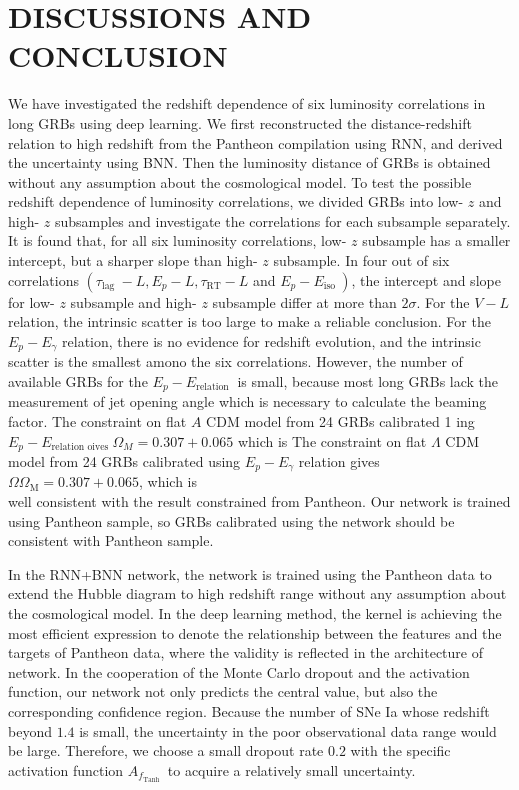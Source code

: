 \documentclass[10pt, a4paper]{article}
\begin{document}
\section{DISCUSSIONS AND CONCLUSION}
We have investigated the redshift dependence of six luminosity correlations in long GRBs using deep learning. We first reconstructed the distance-redshift relation to high redshift from the Pantheon compilation using RNN, and derived the uncertainty using BNN. Then the luminosity distance of GRBs is obtained without any assumption about the cosmological model. To test the possible redshift dependence of luminosity correlations, we divided GRBs into low- $z$ and high- $z$ subsamples and investigate the correlations for each subsample separately. It is found that, for all six luminosity correlations, low- $z$ subsample has a smaller intercept, but a sharper slope than high- $z$ subsample. In four out of six correlations $\left(\tau_{\text {lag }}-L, E_{p}-L, \tau_{\mathrm{RT}}-L\right.$ and $\left.E_{p}-E_{\text {iso }}\right)$, the intercept and slope for low- $z$ subsample and high- $z$ subsample differ at more than $2 \sigma$. For the $V-L$ relation, the intrinsic scatter is too large to make a reliable conclusion. For the $E_{p}-E_{\gamma}$ relation, there is no evidence for redshift evolution, and the intrinsic scatter is the smallest amono the six correlations. However, the number of available $\mathrm{GRBs}$ for the $E_{p}-E_{\text {relation }}$ is small, because most long GRBs lack the measurement of jet opening angle which is necessary to calculate the beaming factor. The constraint on flat $A$ CDM model from 24 GRBs calibrated 1 ing $E_{p}-E_{\text {relation oives }} \Omega_{M}=0.307+0.065$ which is The constraint on flat $\Lambda$ CDM model from 24 GRBs calibrated using $E_{p}-E_{\gamma}$ relation gives $\Omega \Omega_{\mathrm{M}}=0.307+0.065$, which is\\
well consistent with the result constrained from Pantheon. Our network is trained using Pantheon sample, so GRBs calibrated using the network should be consistent with Pantheon sample.

In the RNN+BNN network, the network is trained using the Pantheon data to extend the Hubble diagram to high redshift range without any assumption about the cosmological model. In the deep learning method, the kernel is achieving the most efficient expression to denote the relationship between the features and the targets of Pantheon data, where the validity is reflected in the architecture of network. In the cooperation of the Monte Carlo dropout and the activation function, our network not only predicts the central value, but also the corresponding confidence region. Because the number of SNe Ia whose redshift beyond $1.4$ is small, the uncertainty in the poor observational data range would be large. Therefore, we choose a small dropout rate $0.2$ with the specific activation function $A_{f_{\text {Tanh }}}$ to acquire a relatively small uncertainty.
\end{document}

